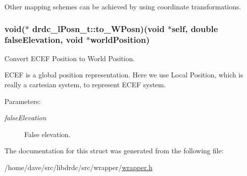 Other mapping schemes can be achieved by using coordinate transformations. \hypertarget{structdrdc__lPosn__t_e620ba6725974a69bb92bf5cee9d3fb7}{
\subsubsection[to\_\-WPosn]{\setlength{\rightskip}{0pt plus 5cm}void($\ast$ {\bf drdc\_\-lPosn\_\-t::to\_\-WPosn})(void $\ast$self, double falseElevation, void $\ast$worldPosition)}}
\label{structdrdc__lPosn__t_e620ba6725974a69bb92bf5cee9d3fb7}


Convert ECEF Position to World Position. 

ECEF is a global position representation. Here we use Local Position, which is really a cartesian system, to represent ECEF system.

\begin{Desc}
\item[Parameters:]
\begin{description}
\item[{\em falseElevation}]False elevation. \end{description}
\end{Desc}


The documentation for this struct was generated from the following file:\begin{CompactItemize}
\item 
/home/dave/src/libdrdc/src/wrapper/\hyperlink{wrapper_8h}{wrapper.h}\end{CompactItemize}
